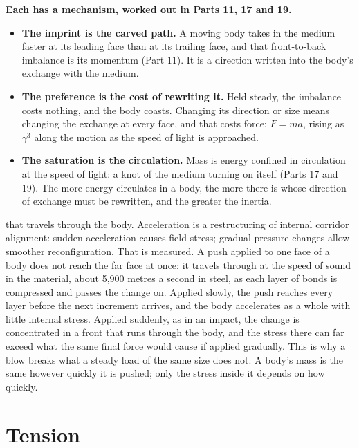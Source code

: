 \begin{hypbar}
\textbf{Each has a mechanism, worked out in Parts 11, 17 and 19.}
\begin{itemize}
\item \textbf{The imprint is the carved path.} A moving body takes in the medium faster at its leading face than at its trailing face, and that front-to-back imbalance is its momentum (Part 11).\footnotemark{} It is a direction written into the body's exchange with the medium.
\item \textbf{The preference is the cost of rewriting it.} Held steady, the imbalance costs nothing, and the body coasts. Changing its direction or size means changing the exchange at every face, and that costs force: $F=ma$, rising as $\gamma^3$ along the motion as the speed of light is approached.
\item \textbf{The saturation is the circulation.} Mass is energy confined in circulation at the speed of light: a knot of the medium turning on itself (Parts 17 and 19). The more energy circulates in a body, the more there is whose direction of exchange must be rewritten, and the greater the inertia.
\end{itemize}
\end{hypbar}

 that travels through the body. Acceleration is a restructuring of internal corridor alignment: sudden acceleration causes field stress; gradual pressure changes allow smoother reconfiguration. That is measured. A push applied to one face of a body does not reach the far face at once: it travels through at the speed of sound in the material, about 5,900 metres a second in steel, as each layer of bonds is compressed and passes the change on. Applied slowly, the push reaches every layer before the next increment arrives, and the body accelerates as a whole with little internal stress. Applied suddenly, as in an impact, the change is concentrated in a front that runs through the body, and the stress there can far exceed what the same final force would cause if applied gradually. This is why a blow breaks what a steady load of the same size does not. A body's mass is the same however quickly it is pushed; only the stress inside it depends on how quickly.

\section{Tension}

